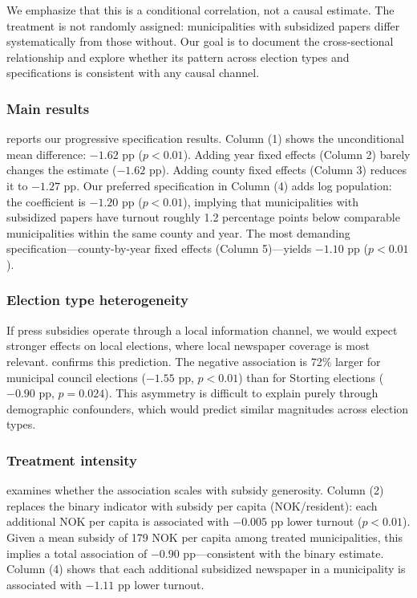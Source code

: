\documentclass[12pt]{article}
\begin{document}
We emphasize that this is a conditional correlation, not a causal estimate. The treatment is not randomly assigned: municipalities with subsidized papers differ systematically from those without. Our goal is to document the cross-sectional relationship and explore whether its pattern across election types and specifications is consistent with any causal channel.

\subsubsection*{Main results}  reports our progressive specification results. Column (1) shows the unconditional mean difference: $-1.62$ pp ($p < 0.01$). Adding year fixed effects (Column 2) barely changes the estimate ($-1.62$ pp). Adding county fixed effects (Column 3) reduces it to $-1.27$ pp. Our preferred specification in Column (4) adds log population: the coefficient is $-1.20$ pp ($p < 0.01$), implying that municipalities with subsidized papers have turnout roughly 1.2 percentage points below comparable municipalities within the same county and year. The most demanding specification---county-by-year fixed effects (Column 5)---yields $-1.10$ pp ($p < 0.01$).



\subsubsection*{Election type heterogeneity} If press subsidies operate through a local information channel, we would expect stronger effects on local elections, where local newspaper coverage is most relevant.  confirms this prediction. The negative association is 72\% larger for municipal council elections ($-1.55$ pp, $p < 0.01$) than for Storting elections ($-0.90$ pp, $p = 0.024$). This asymmetry is difficult to explain purely through demographic confounders, which would predict similar magnitudes across election types.



\subsubsection*{Treatment intensity}  examines whether the association scales with subsidy generosity. Column (2) replaces the binary indicator with subsidy per capita (NOK/resident): each additional NOK per capita is associated with $-0.005$ pp lower turnout ($p < 0.01$). Given a mean subsidy of 179 NOK per capita among treated municipalities, this implies a total association of $-0.90$ pp---consistent with the binary estimate. Column (4) shows that each additional subsidized newspaper in a municipality is associated with $-1.11$ pp lower turnout.
\end{document}
